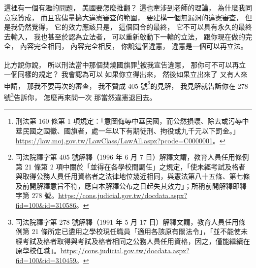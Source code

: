 \hypertarget{w06:cue:2835}{}這裡有一個有趣的問題，
\hypertarget{w06:cue:2836}{}美國要怎麼推翻？
\hypertarget{w06:cue:2837}{}這也牽涉到老師的理論，
\hypertarget{w06:cue:2838}{}為什麼我同意我贊成，
\hypertarget{w06:cue:2839}{}而且我儘量擴大違憲審查的範圍，
\hypertarget{w06:cue:2840}{}要建構一個無漏洞的違憲審查，
\hypertarget{w06:cue:2841}{}但是我仍然覺得，
\hypertarget{w06:cue:2842}{}它的效力應該只是，
\hypertarget{w06:cue:2843}{}這個回合的最終，
\hypertarget{w06:cue:2844}{}它不可以具有永久的最終去輸入，
\hypertarget{w06:cue:2845}{}我也甚至於認為立法者，
\hypertarget{w06:cue:2846}{}可以重新啟動下一輪的立法，
\hypertarget{w06:cue:2847}{}跟你現在做的完全，
\hypertarget{w06:cue:2848}{}內容完全相同，
\hypertarget{w06:cue:2849}{}內容完全相反，
\hypertarget{w06:cue:2850}{}你說這個違憲，
\hypertarget{w06:cue:2851}{}違憲是一個可以再立法。

\hypertarget{w06:cue:2852}{}比方說你說，
\hypertarget{w06:cue:2853}{}所以刑法當中那個焚燒國旗罪\footnote{刑法第 160 條第 1 項規定：「意圖侮辱中華民國，而公然損壞、除去或污辱中華民國之國徽、國旗者，處一年以下有期徒刑、拘役或九千元以下罰金。」\url{https://law.moj.gov.tw/LawClass/LawAll.aspx?pcode=C0000001}。}被我宣告違憲，
\hypertarget{w06:cue:2854}{}那你可不可以再立一個同樣的規定？
\hypertarget{w06:cue:2855}{}我會認為可以 如果你立得出來，
\hypertarget{w06:cue:2856}{}然後如果立出來了 又有人來申請，
\hypertarget{w06:cue:2857}{}那我不要再次的審查，
\hypertarget{w06:cue:2858}{}我不贊成 405 號\footnote{司法院釋字第 405 號解釋（1996 年 6 月 7 日）解釋文謂，教育人員任用條例第 21 條第 2 項中關於「並得在各學校間調任」之規定，「使未經考試及格者與取得公務人員任用資格者之法律地位幾近相同，與憲法第八十五條、第七條及前開解釋意旨不符，應自本解釋公布之日起失其效力」；所稱前開解釋即釋字第 278 號。\url{https://cons.judicial.gov.tw/docdata.aspx?fid=100&id=310586}。}的見解，
\hypertarget{w06:cue:2859}{}我見解就告訴你在 278 號\footnote{司法院釋字第 278 號解釋（1991 年 5 月 17 日）解釋文謂，教育人員任用條例第 21 條所定已遴用之學校現任職員「適用各該原有關法令」，「並不能使未經考試及格者取得與考試及格者相同之公務人員任用資格，因之，僅能繼續在原學校任職」。\url{https://cons.judicial.gov.tw/docdata.aspx?fid=100&id=310459}。}告訴你，
\hypertarget{w06:cue:2860}{}怎麼再來問一次 那當然違憲退回去。

